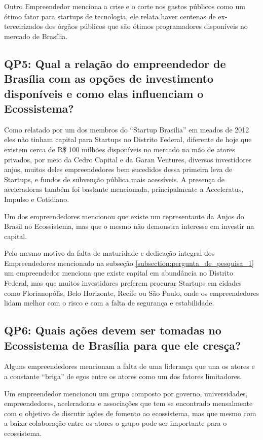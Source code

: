 Outro Empreendedor menciona a crise e o corte nos gastos públicos como um ótimo fator para startups de tecnologia, ele relata haver centenas de ex-terceirizados dos órgãos públicos que são ótimos programadores disponíveis no mercado de Brasília.

\subsection{QP5: Qual a relação do empreendedor de Brasília com as opções de investimento disponíveis e como elas influenciam o Ecossistema?}
\label{subsection:pergunta_de_pesquisa_5}

Como relatado por um dos membros do ``Startup Brasilia'' em meados de 2012 eles não tinham capital para Startups no Distrito Federal, diferente de hoje que existem cerca de R\$ 100 milhões disponíveis no mercado na mão de atores privados, por meio da Cedro Capital e da Garan Ventures, diversos investidores anjos, muitos deles empreendedores bem sucedidos dessa primeira leva de Startups, e fundos de subvenção pública mais acessíveis. A presença de aceleradoras também foi bastante mencionada, principalmente a Acceleratus, Impulso e Cotidiano. 

Um dos empreendedores mencionou que existe um representante da Anjos do Brasil no Ecossistema, mas que o mesmo não demonstra interesse em investir na capital.

Pelo mesmo motivo da falta de maturidade e dedicação integral dos Empreendedores mencionado na subseção \ref{subsection:pergunta_de_pesquisa_1} um empreendedor menciona que existe capital em abundância no Distrito Federal, mas que muitos investidores preferem procurar Startups em cidades como Florianopólis, Belo Horizonte, Recife ou São Paulo, onde os empreendedores lidam melhor com o risco e com a falta de segurança e estabilidade.

\subsection{QP6: Quais ações devem ser tomadas no Ecossistema de Brasília para que ele cresça?}
\label{subsection:pergunta_de_pesquisa_6}

Alguns empreendedores mencionam a falta de uma liderança que una os atores e a constante ``briga'' de egos entre os atores como um dos fatores limitadores.

Um empreendedor mencionou um grupo composto por governo, universidades, empreendedores, aceleradoras e associações que tem se encontrado mensalmente com o objetivo de discutir ações de fomento ao ecossistema, mas que mesmo com a baixa colaboração entre os atores o grupo pode ser importante para o ecossistema. 

